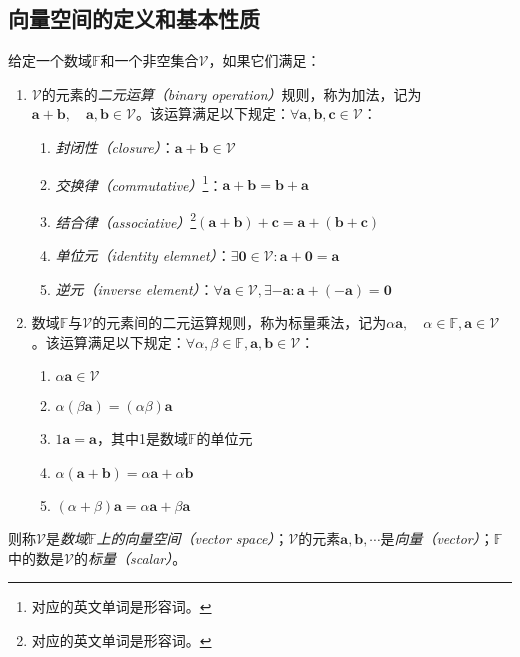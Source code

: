 \documentclass[../main.tex]{subfiles}
\begin{document}
\subsection{向量空间的定义和基本性质}\label{sec:II.2.1.2}
\begin{definition}[向量空间]\label{def:II.2.1}
    给定一个数域$\mathbb{F}$和一个非空集合$\mathcal{V}$，如果它们满足：
    \begin{enumerate}
        \item $\mathcal{V}$的元素的\emph{二元运算（binary operation）}规则，称为加法，记为$\mathbf{a}+\mathbf{b},\quad\mathbf{a},\mathbf{b}\in\mathcal{V}$。该运算满足以下规定：$\forall\mathbf{a},\mathbf{b},\mathbf{c}\in \mathcal{V}$：
              \begin{enumerate}
                  \item \emph{封闭性（closure）}：$\mathbf{a}+\mathbf{b}\in\mathcal{V}$
                  \item \emph{交换律（commutative）}\footnote{对应的英文单词是形容词。}：$\mathbf{a}+\mathbf{b}=\mathbf{b}+\mathbf{a}$
                  \item \emph{结合律（associative）}\footnote{对应的英文单词是形容词。}$\left(\mathbf{a}+\mathbf{b}\right)+\mathbf{c}=\mathbf{a}+\left(\mathbf{b}+\mathbf{c}\right)$
                  \item \emph{单位元（identity elemnet）}：$\exists \mathbf{0}\in\mathcal{V}:\mathbf{a}+\mathbf{0}=\mathbf{a}$
                  \item \emph{逆元（inverse element）}：$\forall \mathbf{a}\in\mathcal{V},\exists -\mathbf{a}:\mathbf{a}+\left(-\mathbf{a}\right)=\mathbf{0}$
              \end{enumerate}
        \item 数域$\mathbb{F}$与$\mathcal{V}$的元素间的二元运算规则，称为标量乘法，记为$\alpha\mathbf{a},\quad\alpha\in\mathbb{F},\mathbf{a}\in\mathcal{V}$。该运算满足以下规定：$\forall\alpha,\beta\in\mathbb{F},\mathbf{a},\mathbf{b}\in\mathcal{V}$：
              \begin{enumerate}
                  \item $\alpha\mathbf{a}\in\mathcal{V}$
                  \item $\alpha\left(\beta\mathbf{a}\right)=\left(\alpha\beta\right)\mathbf{a}$
                  \item $1\mathbf{a}=\mathbf{a}$，其中1是数域$\mathbb{F}$的单位元
                  \item $\alpha\left(\mathbf{a}+\mathbf{b}\right)=\alpha\mathbf{a}+\alpha\mathbf{b}$
                  \item $\left(\alpha+\beta\right)\mathbf{a}=\alpha\mathbf{a}+\beta\mathbf{a}$
              \end{enumerate}
    \end{enumerate}
    则称$\mathcal{V}$是\emph{数域$\mathbb{F}$上的向量空间（vector space）}；$\mathcal{V}$的元素$\mathbf{a},\mathbf{b},\cdots$是\emph{向量（vector）}；$\mathbb{F}$中的数是$\mathcal{V}$的\emph{标量（scalar）}。
\end{definition}
\end{document}
